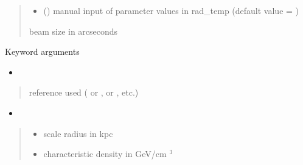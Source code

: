 \documentclass[letterpaper,10pt,english]{sphinxmanual}
\begin{document}
\begin{fulllineitems}
\begin{quote}
\begin{description}
\begin{itemize}
\item {} 
\sphinxAtStartPar
{} () \textendash{} manual input of parameter values in rad\_temp (default value = )

\end{itemize}

\sphinxAtStartPar
beam size in arcseconds

\end{description}\end{quote}

\sphinxAtStartPar
Keyword arguments
\begin{itemize}
\item {} 
\sphinxAtStartPar
{}

\end{itemize}
\begin{quote}\begin{description}
\sphinxAtStartPar
{} \textendash{} reference used ( or \sphinxcode{\sphinxupquote{\textquotesingle{}1309.2641\textquotesingle{}}},  or \sphinxcode{\sphinxupquote{\textquotesingle{}1408.0002\textquotesingle{}}}, etc.)

\end{description}\end{quote}
\begin{itemize}
\item {} 
\sphinxAtStartPar
{}

\end{itemize}
\begin{quote}\begin{description}
\begin{itemize}
\item {} 
\sphinxAtStartPar
{} \textendash{} scale radius in kpc

\item {} 
\sphinxAtStartPar
{} \textendash{} characteristic density in GeV/cm \({}^3\)


\end{itemize}
\end{description}
\end{quote}
\end{fulllineitems}
\end{document}
